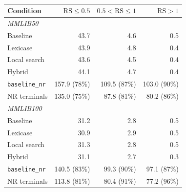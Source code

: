 \begin{table}[htbp]
  \centering
  \small
  \caption[108-class breakdown by resource strength]{}
  \label{tab:full108-rs}
  \begin{tabular}{lrrr}
    \toprule
    \textbf{Condition} & $\mathrm{RS} \le 0.5$ & $0.5 < \mathrm{RS} \le 1$ & $\mathrm{RS} > 1$ \\
    \midrule
    \multicolumn{4}{l}{\textit{MMLIB50}} \\
    Baseline & 43.7 & 4.6 & 0.5 \\
    Lexicase & 43.9 & 4.8 & 0.4 \\
    Local search & 43.6 & 4.5 & 0.4 \\
    Hybrid & 44.1 & 4.7 & 0.4 \\
    \texttt{baseline\_nr} & 157.9 (78\%) & 109.5 (87\%) & 103.0 (90\%) \\
    NR terminals & 135.0 (75\%) & 87.8 (81\%) & 80.2 (86\%) \\
    \midrule
    \multicolumn{4}{l}{\textit{MMLIB100}} \\
    Baseline & 31.2 & 2.8 & 0.5 \\
    Lexicase & 30.9 & 2.9 & 0.5 \\
    Local search & 31.3 & 2.8 & 0.5 \\
    Hybrid & 31.1 & 2.7 & 0.3 \\
    \texttt{baseline\_nr} & 140.5 (83\%) & 99.3 (90\%) & 97.1 (87\%) \\
    NR terminals & 113.8 (81\%) & 80.4 (91\%) & 77.2 (96\%) \\
    \bottomrule
  \end{tabular}
\end{table}

